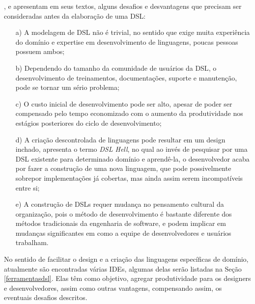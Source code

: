 ,  e  apresentam em seus textos, alguns desafios e desvantagens que precisam ser consideradas antes da elaboração de uma \gls{DSL}:

\begin{enumerate}
    \item[a)] A modelagem de \gls{DSL} não é trivial, no sentido que exige muita experiência do domínio e expertise em desenvolvimento de linguagens, poucas pessoas possuem ambos;
    \item[b)] Dependendo do tamanho da comunidade de usuários da \gls{DSL}, o desenvolvimento de treinamentos, documentações, suporte e manutenção, pode se tornar um sério problema;
    \item[c)] O custo inicial de desenvolvimento pode ser alto, apesar de poder ser compensado pelo tempo economizado com o aumento da produtividade nos estágios posteriores do ciclo de desenvolvimento;
    \item[d)] A criação descontrolada de linguagens pode resultar em um design inchado,  apresenta o termo \textit{DSL Hell}, no qual ao invés de pesquisar por uma \gls{DSL} existente para determinado domínio e aprendê-la, o desenvolvedor acaba por fazer a construção de uma nova linguagem, que pode possivelmente sobrepor implementações já cobertas, mas ainda assim serem incompatíveis entre si;
    \item[e)] A construção de \gls{DSL}s requer mudança no pensamento cultural da organização, pois o método de desenvolvimento é bastante diferente dos métodos tradicionais da engenharia de software, e podem implicar em mudanças significantes em como a equipe de desenvolvedores e usuários trabalham.
    
\end{enumerate}

No sentido de facilitar o design e a criação das linguagens específicas de domínio, atualmente são encontradas várias \gls{IDE}s, algumas delas serão listadas na Seção \ref{ferramentasdsl}. Elas têm como objetivo, agregar produtividade para os designers e desenvolvedores, assim como outras vantagens, compensando assim, os eventuais desafios descritos.



